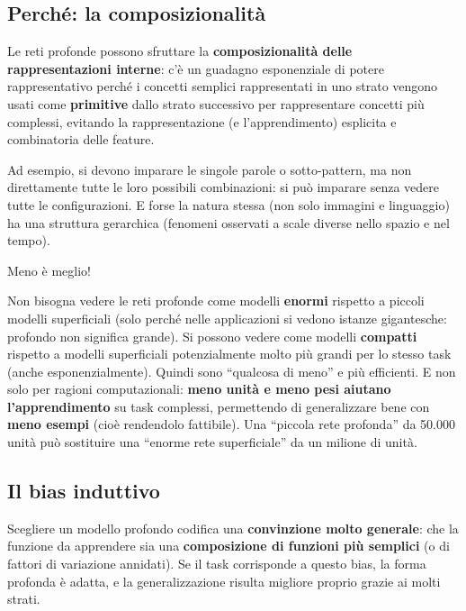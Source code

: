 \subsection{Perché: la
composizionalità}\label{perchuxe9-la-composizionalituxe0}

Le reti profonde possono sfruttare la \textbf{composizionalità delle
rappresentazioni interne}: c'è un guadagno esponenziale di potere
rappresentativo perché i concetti semplici rappresentati in uno strato
vengono usati come \textbf{primitive} dallo strato successivo per
rappresentare concetti più complessi, evitando la rappresentazione (e
l'apprendimento) esplicita e combinatoria delle feature.

Ad esempio, si devono imparare le singole parole o sotto-pattern, ma non
direttamente tutte le loro possibili combinazioni: si può imparare senza
vedere tutte le configurazioni. E forse la natura stessa (non solo
immagini e linguaggio) ha una struttura gerarchica (fenomeni osservati a
scale diverse nello spazio e nel tempo).

\begin{boxtip}{Meno è meglio!}

Non bisogna vedere le reti profonde come modelli \textbf{enormi}
rispetto a piccoli modelli superficiali (solo perché nelle applicazioni
si vedono istanze gigantesche: profondo non significa grande). Si
possono vedere come modelli \textbf{compatti} rispetto a modelli
superficiali potenzialmente molto più grandi per lo stesso task (anche
esponenzialmente). Quindi sono ``qualcosa di meno'' e più efficienti. E
non solo per ragioni computazionali: \textbf{meno unità e meno pesi
aiutano l'apprendimento} su task complessi, permettendo di generalizzare
bene con \textbf{meno esempi} (cioè rendendolo fattibile). Una ``piccola
rete profonda'' da 50.000 unità può sostituire una ``enorme rete
superficiale'' da un milione di unità.

\end{boxtip}

\subsection{Il bias induttivo}\label{il-bias-induttivo}

Scegliere un modello profondo codifica una \textbf{convinzione molto
generale}: che la funzione da apprendere sia una \textbf{composizione di
funzioni più semplici} (o di fattori di variazione annidati). Se il task
corrisponde a questo bias, la forma profonda è adatta, e la
generalizzazione risulta migliore proprio grazie ai molti strati.

